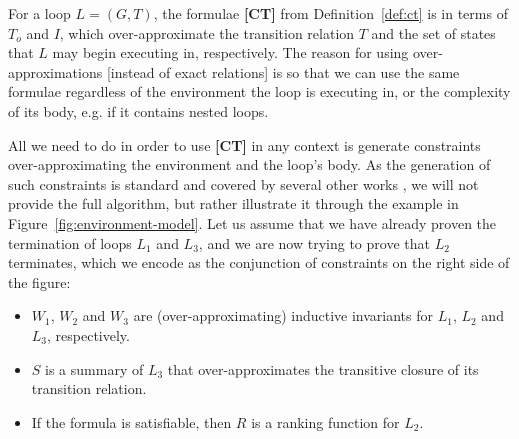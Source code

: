 \documentclass[preprint]{sigplanconf}
\theoremstyle{definition}
\begin{document}
%
For a loop $L=(G,T)$, the formulae {\bf [CT]} %
from Definition~\ref{def:ct} 
is in terms of 
$T_o$ and $I$, which over-approximate the transition relation $T$ and the set of states that $L$ may begin executing in, respectively. 
The reason for using over-approximations [instead of exact relations] %
is so that we can use the same formulae regardless of the environment the loop is executing in, or 
the complexity of its body, e.g. if it contains nested loops.

All we need to do in order to use {\bf [CT]} in any context %
is generate constraints over-approximating %
the environment and the loop's body. %
As the generation of such constraints is standard and covered by several other works \cite{DBLP:conf/pldi/GrebenshchikovLPR12,DBLP:conf/pldi/GulwaniSV08}, 
we will not provide the full algorithm, but rather illustrate it through the example in Figure~\ref{fig:environment-model}.
Let us assume that we have already proven the termination of loops $L_1$ and $L_3$, and we are now trying to prove that $L_2$ terminates, which we encode
as the conjunction of constraints on the right side of the figure:
\begin{itemize}
\item $W_1$, $W_2$ and $W_3$ are (over-approximating) inductive invariants for $L_1$, $L_2$ and $L_3$, respectively.
\item $S$ is a summary of $L_3$ that over-approximates the transitive closure of its transition relation.
\item If the formula is satisfiable, then $R$ is a ranking function for $L_2$.
 \end{itemize}
\end{document}

